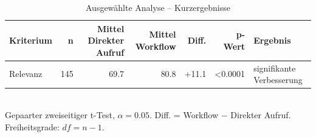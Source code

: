 \begin{table}[htbp]
\centering
\caption{Ausgewählte Analyse -- Kurzergebnisse}
\begin{tabular}{lrrrrrl}
\toprule
Kriterium & n & Mittel Direkter Aufruf & Mittel Workflow & Diff. & p-Wert & Ergebnis \\
\midrule
Relevanz & 145 & 69.7 & 80.8 & +11.1 & <0.0001 & signifikante Verbesserung \\
\bottomrule
\end{tabular}
\\[2mm]
\footnotesize Gepaarter zweiseitiger t-Test, $\alpha=0.05$. Diff. = Workflow $-$ Direkter Aufruf. Freiheitsgrade: $df=n-1$.
\end{table}
